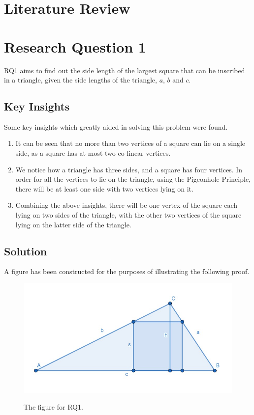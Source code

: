 \documentclass[12pt]{scrartcl}
\begin{document}
\section{Literature Review}

\section{Research Question 1}

RQ1 aims to find out the side length of the largest square that can be inscribed in a triangle,
given the side lengths of the triangle, $a$, $b$ and $c$.

\subsection{Key Insights}
Some key insights which greatly aided in solving this problem were found.
\begin{enumerate}
	\item It can be seen that no more than two vertices of a square can lie on a single side,
	      as a square has at most two co-linear vertices.
	\item We notice how a triangle has three sides, and a square has four vertices.
	      In order for all the vertices to lie on the triangle, using the Pigeonhole Principle,
	      there will be at least one side with two vertices lying on it.
	\item Combining the above insights, there will be one vertex of the square
	      each lying on two sides of the triangle, with the other two vertices of the square
	      lying on the latter side of the triangle.
\end{enumerate}

\subsection{Solution}
A figure has been constructed for the purposes of illustrating the following proof.
\begin{figure}[htpb]
	\centering
	\includegraphics[scale=.75]{images/rq1.jpg}
	\label{fig:rq1_img}
	\caption{The figure for RQ1.}
\end{figure}
\end{document}
